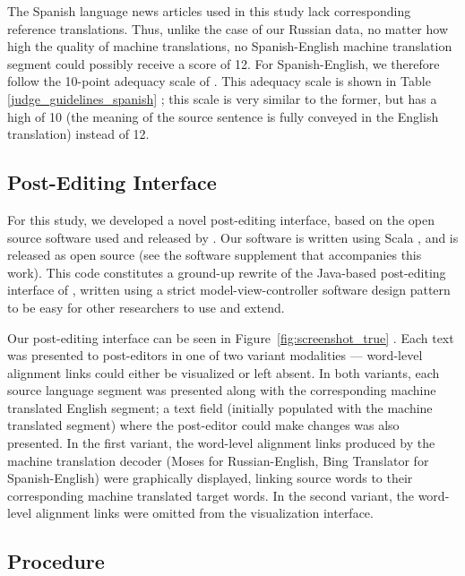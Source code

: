 The Spanish language news articles used in this study lack corresponding reference translations.
%
Thus, unlike the case of our Russian data, no matter how high the quality of machine translations, no Spanish-English machine translation segment could possibly receive a score of 12.
%
For Spanish-English, we therefore follow the 10-point adequacy scale of \citet{2009_EACL_Albrecht_etal}.
%
This adequacy scale is shown in Table \ref{judge_guidelines_spanish} ;
%
this scale is very similar to the former, but has a high of 10 (the meaning of the source sentence is fully conveyed in the English translation) instead of 12.





\subsection{Post-Editing Interface}

For this study, we developed a novel post-editing interface, based on the open source software used and released by \citet{2014_WMT_Schwartz_etal}.
%
Our software is written using Scala \citep{2014_Scala_Odersky}, and is released as open source (see the software supplement that accompanies this work).
%
This code constitutes a ground-up rewrite of the Java-based post-editing interface of \citet{2014_WMT_Schwartz_etal}, written using a strict model-view-controller software design pattern to be easy for other researchers to use and extend.

Our post-editing interface can be seen in Figure~\ref{fig:screenshot_true} .
%
Each text was presented to post-editors in one of two variant modalities --- word-level alignment links could either be visualized or left absent.
%
In both variants, each source language segment was presented along with the corresponding machine translated English segment; a text field (initially populated with the machine translated segment) where the post-editor could make changes was also presented.
%
In the first variant, the word-level alignment links produced by the machine translation decoder (Moses for Russian-English, Bing Translator for Spanish-English) were graphically displayed, linking source words to their corresponding machine translated target words.
%
In the second variant, the word-level alignment links were omitted from the visualization interface.



\subsection{Procedure}

